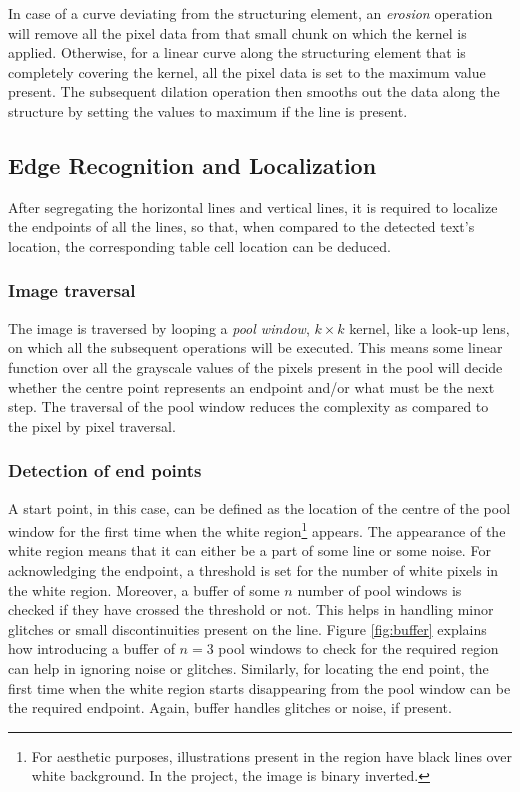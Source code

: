 \documentclass[10pt,journal,compsoc]{IEEEtran}
\begin{document}
In case of a curve deviating from the structuring element, an \textit{erosion} operation will remove all the pixel data from that small chunk on which the kernel is applied. Otherwise, for a linear curve along the structuring element that is completely covering the kernel, all the pixel data is set to the maximum value present. The subsequent dilation operation then smooths out the data along the structure by setting the values to maximum if the line is present.

\subsection{Edge Recognition and Localization}
After segregating the horizontal lines and vertical lines, it is required to localize the endpoints of all the lines, so that, when compared to the detected text's location, the corresponding table cell location can be deduced.

\subsubsection{Image traversal}
The image is traversed by looping a \textit{pool window}, $k{\times}k$ kernel, like a look-up lens, on which all the subsequent operations will be executed. This means some linear function over all the grayscale values of the pixels present in the pool will decide whether the centre point represents an endpoint and/or what must be the next step. The traversal of the pool window reduces the complexity as compared to the pixel by pixel traversal.

\subsubsection{Detection of end points}
A start point, in this case, can be defined as the location of the centre of the pool window for the first time when the white region\footnote{For aesthetic purposes, illustrations present in the region have black lines over white background. In the project, the image is binary inverted.} appears. The appearance of the white region means that it can either be a part of some line or some noise. For acknowledging the endpoint, a threshold is set for the number of white pixels in the white region. Moreover, a buffer of some $n$ number of pool windows is checked if they have crossed the threshold or not. This helps in handling minor glitches or small discontinuities present on the line. Figure \ref{fig:buffer} explains how introducing a buffer of $n=3$ pool windows to check for the required region can help in ignoring noise or glitches. Similarly, for locating the end point, the first time when the white region starts disappearing from the pool window can be the required endpoint. Again, buffer handles glitches or noise, if present.
\end{document}
